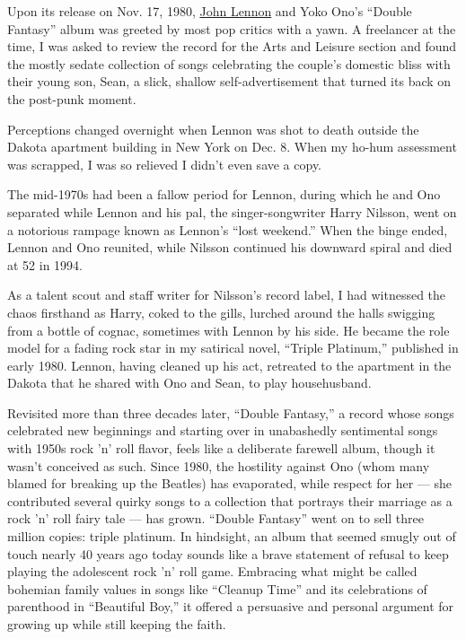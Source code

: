 Upon its release on Nov. 17, 1980,
\href{https://www.nytimes.com/topic/person/john-lennon}{John Lennon} and
Yoko Ono's ``Double Fantasy'' album was greeted by most pop critics with
a yawn. A freelancer at the time, I was asked to review the record for
the Arts and Leisure section and found the mostly sedate collection of
songs celebrating the couple's domestic bliss with their young son,
Sean, a slick, shallow self-advertisement that turned its back on the
post-punk moment.

Perceptions changed overnight when Lennon was shot to death outside the
Dakota apartment building in New York on Dec. 8. When my ho-hum
assessment was scrapped, I was so relieved I didn't even save a copy.

The mid-1970s had been a fallow period for Lennon, during which he and
Ono separated while Lennon and his pal, the singer-songwriter Harry
Nilsson, went on a notorious rampage known as Lennon's ``lost weekend.''
When the binge ended, Lennon and Ono reunited, while Nilsson continued
his downward spiral and died at 52 in 1994.

As a talent scout and staff writer for Nilsson's record label, I had
witnessed the chaos firsthand as Harry, coked to the gills, lurched
around the halls swigging from a bottle of cognac, sometimes with Lennon
by his side. He became the role model for a fading rock star in my
satirical novel, ``Triple Platinum,'' published in early 1980. Lennon,
having cleaned up his act, retreated to the apartment in the Dakota that
he shared with Ono and Sean, to play househusband.

Revisited more than three decades later, ``Double Fantasy,'' a record
whose songs celebrated new beginnings and starting over in unabashedly
sentimental songs with 1950s rock 'n' roll flavor, feels like a
deliberate farewell album, though it wasn't conceived as such. Since
1980, the hostility against Ono (whom many blamed for breaking up the
Beatles) has evaporated, while respect for her --- she contributed
several quirky songs to a collection that portrays their marriage as a
rock 'n' roll fairy tale --- has grown. ``Double Fantasy'' went on to
sell three million copies: triple platinum. In hindsight, an album that
seemed smugly out of touch nearly 40 years ago today sounds like a brave
statement of refusal to keep playing the adolescent rock 'n' roll game.
Embracing what might be called bohemian family values in songs like
``Cleanup Time'' and its celebrations of parenthood in ``Beautiful
Boy,'' it offered a persuasive and personal argument for growing up
while still keeping the faith.

